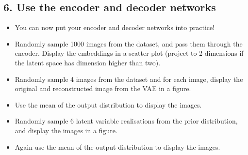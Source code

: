 \documentclass[11pt]{article}
\providecommand{\tightlist}{%
      \setlength{\itemsep}{0pt}\setlength{\parskip}{0pt}}
\newcommand{\prompt}[4]{
        \llap{{\color{#2}[#3]: #4}}\vspace{-1.25em}
    }
\begin{document}
    \begin{tcolorbox}[breakable, size=fbox, boxrule=1pt, pad at break*=1mm,colback=cellbackground, colframe=cellborder]
\prompt{In}{incolor}{ }{\hspace{4pt}}
\begin{Verbatim}[commandchars=\\\{\}]

\end{Verbatim}
\end{tcolorbox}

    \begin{tcolorbox}[breakable, size=fbox, boxrule=1pt, pad at break*=1mm,colback=cellbackground, colframe=cellborder]
\prompt{In}{incolor}{ }{\hspace{4pt}}
\begin{Verbatim}[commandchars=\\\{\}]

\end{Verbatim}
\end{tcolorbox}

    \subsection{6. Use the encoder and decoder
networks}\label{use-the-encoder-and-decoder-networks}

\begin{itemize}
\tightlist
\item
  You can now put your encoder and decoder networks into practice!
\item
  Randomly sample 1000 images from the dataset, and pass them through
  the encoder. Display the embeddings in a scatter plot (project to 2
  dimensions if the latent space has dimension higher than two).
\item
  Randomly sample 4 images from the dataset and for each image, display
  the original and reconstructed image from the VAE in a figure.
\item
  Use the mean of the output distribution to display the images.
\item
  Randomly sample 6 latent variable realisations from the prior
  distribution, and display the images in a figure.
\item
  Again use the mean of the output distribution to display the images.
\end{itemize}
\end{document}

